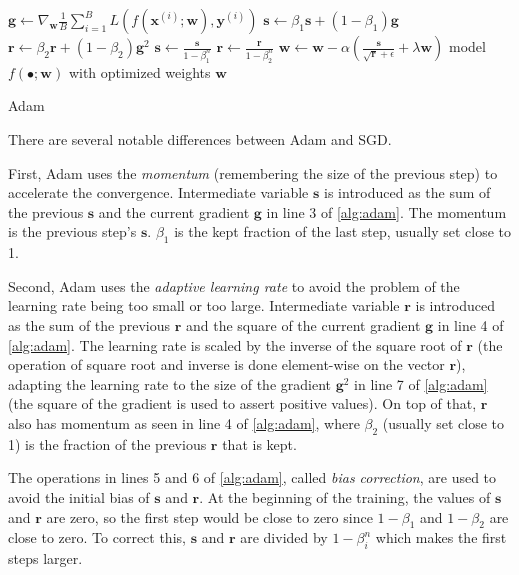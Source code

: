 \begin{description}
\begin{algorithm}
\begin{algorithmic}[1]
            \State $\pmb{g} \gets \nabla_{\pmb{w}} \frac1B \sum_{i=1}^B L(f(\pmb{x}^{(i)};\pmb{w}),\pmb{y}^{(i)})$
            \State $\pmb{s} \gets \beta_1 \pmb{s} + (1 - \beta_1) \pmb{g}$
            \State $\pmb{r} \gets \beta_2 \pmb{r} + (1 - \beta_2) \pmb{g}^2$
            \State $\pmb{s} \gets \frac{\pmb{s}}{1 - \beta_1^n}$
            \State $\pmb{r} \gets \frac{\pmb{r}}{1 - \beta_2^n}$
            \State $\pmb{w} \gets \pmb{w} - \alpha \left( \frac{\pmb{s}}{\sqrt{\pmb{r}} + \epsilon} + \lambda \pmb{w} \right)$
        \EndFor
        \Ensure model $f(\bullet;\pmb{w})$ with optimized weights $\pmb{w}$
        \end{algorithmic}
        \caption{Adam}
        \label{alg:adam}
    \end{algorithm}
    There are several notable differences between Adam and SGD.

    First, Adam uses the \emph{momentum} (remembering the size of the previous step) to accelerate the convergence.
    Intermediate variable $\pmb{s}$ is introduced as the sum of the previous $\pmb{s}$ and the current gradient $\pmb{g}$ in line 3 of \cref{alg:adam}.
    The momentum is the previous step's $\pmb{s}$.
    $\beta_1$ is the kept fraction of the last step, usually set close to 1.
    
    Second, Adam uses the \emph{adaptive learning rate} to avoid the problem of the learning rate being too small or too large.
    Intermediate variable $\pmb{r}$ is introduced as the sum of the previous $\pmb{r}$ and the square of the current gradient $\pmb{g}$ in line 4 of \cref{alg:adam}.
    The learning rate is scaled by the inverse of the square root of $\pmb{r}$ (the operation of square root and inverse is done element-wise on the vector $\pmb{r}$), adapting the learning rate to the size of the gradient $\pmb{g}^2$ in line 7 of \cref{alg:adam} (the square of the gradient is used to assert positive values).
    On top of that, $\pmb{r}$ also has momentum as seen in line 4 of \cref{alg:adam}, where $\beta_2$ (usually set close to 1) is the fraction of the previous $\pmb{r}$ that is kept.

    The operations in lines 5 and 6 of \cref{alg:adam}, called \emph{bias correction}, are used to avoid the initial bias of $\pmb{s}$ and $\pmb{r}$.
    At the beginning of the training, the values of $\pmb{s}$ and $\pmb{r}$ are zero, so the first step would be close to zero since $1 - \beta_1$ and $1 - \beta_2$ are close to zero.
    To correct this, $\pmb{s}$ and $\pmb{r}$ are divided by $1 - \beta_i^n$ which makes the first steps larger.


\end{description}
